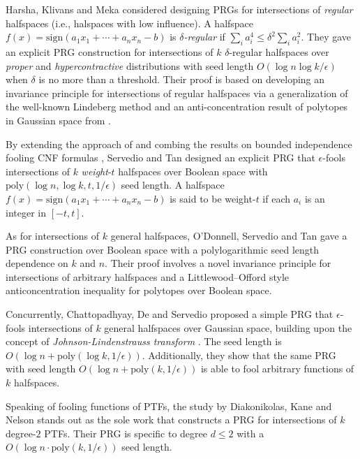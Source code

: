 \documentclass[12pt]{article}
\newcommand{\sign}[1]{\mathrm{sign}\!\br{#1}}
\newcommand{\br}[1]{\left(#1\right)} \newcommand{\Br}[1]{\left[#1\right]} \newcommand{\st}[1]{\left\{#1\right\}} \newcommand{\tr}[1]{\mathrm{Tr}\!\Br{#1}} \newcommand{\abs}[1]{\left|#1 \right|} \newcommand{\norm}[1]{\left\lVert #1 \right\rVert} \newcommand{\agl}[2]{\theta^{\br{#1}}_{#2}} \newcommand{\aglp}[2]{{\theta'}^{\br{#1}}_{#2}} \newcommand{\lint}[1]{\left\lfloor#1\right\rfloor} \newcommand{\poly}[1]{\mathrm{poly}\!\br{#1}} \newcommand{\negl}[1]{\mathrm{negl}\!\br{#1}} \newcommand{\de}[1]{\mathrm{d}#1} \newcommand{\val}[1]{\mathrm{val}\!\br{#1}} \newcommand{\vall}[1]{\mathrm{val}\br{#1}} \newcommand{\nd}[1]{\mathcal{N}\!\br{#1}} \newcommand{\ketbratwo}[2]{\ket{#1} \hspace{-0.4em}\bra{#2}} \newcommand{\ketbra}[1]{\ketbratwo{#1}{#1}} \newcommand{\id}{\ensuremath{\mathds{1}}} \newcommand{\ogroup}[1]{\mathrm{O}\!\br{#1}} \newcommand{\ugroup}[1]{\mathrm{U}\!\br{#1}} \newcommand{\td}{\mathrm{TD}} \newcommand{\tv}[1]{\norm{#1}_{\mathrm{TV}}} \newcommand {\defeq} {\ensuremath{ \stackrel{\mathrm{def}}{=} }} \newcommand{\vdim}{\ensuremath{N}} \newcommand{\dimin}{\ensuremath{n}} \newcommand{\dimout}{\ensuremath{m}} \newcommand{\ncopy}{\ell} \newcommand{\hspacein}{\H_\mathrm{in}} \newcommand{\hspaceout}{\H_\mathrm{out}} \newcommand{\Sin}{\S(\hspacein)} \newcommand{\Sout}{\S(\hspaceout)} \newcommand{\haar}{\ensuremath{\mu}} \newcommand{\tensorhaar}{\ensuremath{\eta}} \newcommand{\tensorsrss}{\ensuremath{\nu}} \newcommand{\qadvice}{\ensuremath{\rho}} \newcommand{\tp}{\otimes} \newcommand{\wone}[2]{W_1\!\br{#1,#2}}
\begin{document}
Harsha, Klivans and Meka \cite{HKM13} considered designing PRGs for intersections of \emph{regular} halfspaces (i.e., halspaces with low influence). 
A halfspace $f(x) = \sign{a_1x_1+\cdots+a_nx_n-b}$ is \emph{$\delta$-regular} if $\sum_i a_i^4\leq \delta^2 \sum_{i} a_i^2$.
They gave an explicit PRG construction for intersections of $k$ $\delta$-regular halfspaces over \emph{proper} and \emph{hypercontractive} distributions with seed length $O(\log n\log k/\epsilon)$ when $\delta$ is no more than a threshold.
Their proof is based on developing an invariance principle for intersections of regular halfspaces via a generalization of the well-known Lindeberg method \cite{Lin22} and an anti-concentration result of polytopes in Gaussian space from \cite{KOS08}.

By extending the approach of \cite{HKM13} and combing the results on bounded independence fooling CNF formulas \cite{Baz09, Raz09}, Servedio and Tan \cite{ST17} designed an explicit PRG that $\epsilon$-fools intersections of $k$ \emph{weight}-$t$ halfspaces over Boolean space with $\poly{\log n, \log k, t, 1/\epsilon}$ seed length. A halfspace $f(x) = \sign{a_1x_1+\cdots+a_nx_n-b}$ is said to be weight-$t$ if each $a_i$ is an integer in $[-t,t]$.

As for intersections of $k$ general halfspaces, O’Donnell, Servedio and Tan \cite{OST22} gave a PRG construction over Boolean space with a polylogarithmic seed length dependence on $k$ and $n$. Their proof involves a novel invariance principle for intersections of arbitrary halfspaces and a Littlewood–Offord style anticoncentration inequality for polytopes over Boolean space.

Concurrently, Chattopadhyay, De and Servedio \cite{CDS19} proposed a simple PRG that $\epsilon$-fools intersections of $k$ general halfspaces over Gaussian space, building upon the concept of
\emph{Johnson-Lindenstrauss transform} \cite{JL86, KMN11}. The seed length is $O(\log n + \poly{\log k,1/\epsilon})$. Additionally, they show that the same PRG with seed length $O(\log n + \poly{k,1/\epsilon})$ is able to fool arbitrary functions of $k$ halfspaces.

Speaking of fooling functions of PTFs, the study by Diakonikolas, Kane and Nelson \cite{DKN10} stands out as the sole work that constructs a PRG for intersections of $k$ degree-$2$ PTFs. Their PRG is specific to degree $d\leq 2$ with a $O(\log n\cdot\poly{k,1/\epsilon})$ seed length. 
\end{document}
